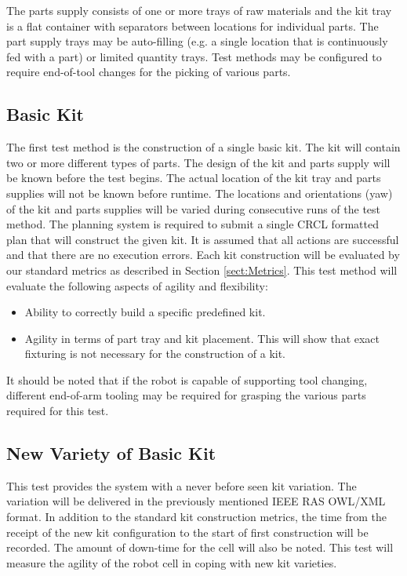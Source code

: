 The parts supply consists of one or more trays of raw materials and
the kit tray is a flat container with separators between locations for individual parts. The part supply trays may be auto-filling (e.g. 
a single location that is continuously fed with a part) or limited quantity trays. Test methods may be configured to require end-of-tool
changes for the picking of various parts.

\subsection{Basic Kit}
The first test method is the construction of a single basic kit. The kit will contain two or more different types of parts. The design of the
kit and parts supply will be known before the test begins. The actual location of the kit tray and parts supplies will not be known before
runtime. The locations and orientations (yaw) of the kit and parts supplies will be varied during consecutive runs of the test method.
The planning system is required to submit a single CRCL formatted plan that will construct the given kit. It is assumed that all
actions are successful and that there are no execution errors.
Each kit construction will be evaluated by our standard metrics as described in Section \ref{sect:Metrics}. 
This test method will evaluate the following aspects of agility and flexibility:
\begin{itemize}
	\item Ability to correctly build a specific predefined kit.
	\item Agility in terms of part tray and kit placement. This will show that exact fixturing is not necessary for the construction
	of a kit.
\end{itemize}

It should be noted that if the robot is capable of supporting tool changing, different end-of-arm tooling may be required for grasping
the various parts required for this test.


\subsection{New Variety of Basic Kit}
This test provides the system with a never before seen kit variation. The variation will be delivered in the previously
mentioned IEEE RAS OWL/XML format. In addition to the standard kit construction metrics, the time from the receipt
of the new kit configuration to the start of first construction will be recorded. The amount of down-time for the
cell will also be noted. This test will measure the agility of the robot cell in coping with new kit varieties.

